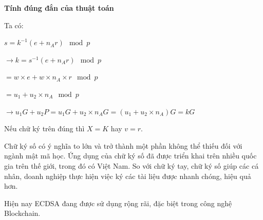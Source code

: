 \textbf{Tính đúng đắn của thuật toán}

Ta có:

$s = k^{-1}(e+ n_A r)\mod p$

$\to k = s^{-1}(e+ n_A r)\mod p$

$= w \times e + w \times n_A \times r \mod p$

$=u_1 + u_2 \times n_A \mod p$

$\to u_1G + u_2P = u_1G + u_2 \times n_A G = (u_1+u_2 \times n_A)G = kG$

Nếu chữ ký trên đúng thì $X=K$ hay $v=r$. \cite{elliptic}



Chữ ký số có ý nghĩa to lớn và trở thành một phần không thể thiếu đối
với ngành mật mã học. Ứng dụng của chữ ký số đã được triển khai trên 
nhiều quốc gia trên thế giới, trong đó có Việt Nam. So với chữ ký tay, 
chữ ký số giúp các cá nhân, doanh nghiệp thực hiện việc ký các tài 
liệu được nhanh chóng, hiệu quả hơn. 

Hiện nay ECDSA đang được sử dụng rộng rãi, đặc biệt trong công nghệ Blockchain. 

